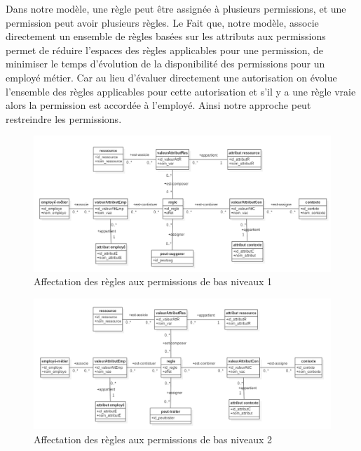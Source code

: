 
\label{sectionAttributionReglePermission}

Dans notre modèle, une règle peut être assignée à plusieurs permissions, et une permission peut avoir plusieurs règles. Le Fait que, notre modèle, associe directement un ensemble de règles basées sur les attributs aux permissions permet de réduire l'espaces des règles applicables pour une permission, de minimiser le temps d'évolution de la disponibilité des permissions pour un  employé métier. Car au lieu  d'évaluer directement une autorisation on évolue l'ensemble des règles applicables pour cette autorisation et s'il y a une règle vraie alors la permission est accordée à l'employé.  Ainsi notre approche peut restreindre les permissions. 

\begin{figure}[h!]
    \centering
		\includegraphics[scale=0.5]{chap3/images/regle-peutsuggerer.png}
    \caption{Affectation des règles aux permissions de bas niveaux 1}
	 \label{figregle-peutsuggerer}
\end{figure} 

\begin{figure}[h!]
    \centering
		\includegraphics[scale=0.5]{chap3/images/reglePeutTraiter.png}
    \caption{Affectation des règles aux permissions de bas niveaux 2}
	 \label{figreglePeutTraiter}
\end{figure} 
\label{sectionParapheur}

